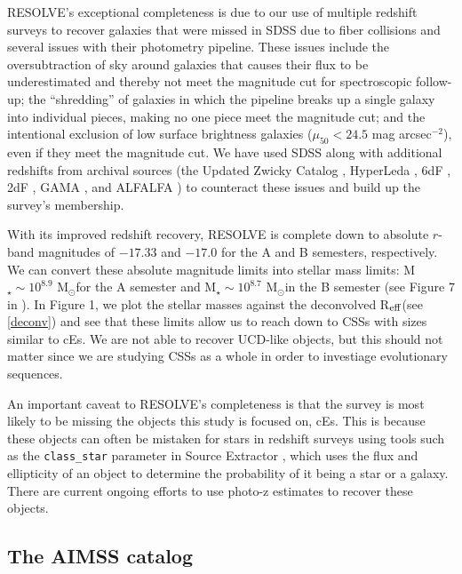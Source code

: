 \documentclass[iop,apj,twocolappendix]{emulateapj}
\newcommand{\Reff}{R$_{\rm eff}$}
\newcommand{\Msun}{M$_{\odot}$}
\begin{document}
RESOLVE's exceptional completeness is due to our use of multiple redshift surveys to recover galaxies that were missed in SDSS due to fiber collisions and several issues with their photometry pipeline. These issues include the oversubtraction of sky around galaxies that causes their flux to be underestimated and thereby not meet the magnitude cut for spectroscopic follow-up; the ``shredding'' of galaxies in which the pipeline breaks up a single galaxy into individual pieces, making no one piece meet the magnitude cut; and the intentional exclusion of low surface brightness galaxies ($\mu_{50} < 24.5$ mag arcsec$^{-2}$), even if they meet the magnitude cut. We have used SDSS along with additional redshifts from archival sources (the Updated Zwicky Catalog \citep{Falco1999}, HyperLeda \citep{Paturel2003}, 6dF \citep{Jones2009}, 2dF \citep{Colless2001}, GAMA \citep{Driver2011}, and ALFALFA \citep{Haynes2011}) to counteract these issues and build up the survey's membership.

With its improved redshift recovery, RESOLVE is complete down to absolute $r$-band magnitudes of $-17.33$ and $-17.0$ for the A and B semesters, respectively. We can convert these absolute magnitude limits into stellar mass limits: M$_{\star} \sim 10^{8.9}$ \Msun for the A semester and M$_{\star} \sim 10^{8.7}$ \Msun in the B semester (see Figure 7 in \citet{Eckert2015B}). In Figure 1, we plot the stellar masses against the deconvolved \Reff (see \autoref{deconv}) and see that these limits allow us to reach down to CSSs with sizes similar to cEs. We are not able to recover UCD-like objects, but this should not matter since we are studying CSSs as a whole in order to investiage evolutionary sequences.

An important caveat to RESOLVE's completeness is that the survey is most likely to be missing the objects this study is focused on, cEs. This is because these objects can often be mistaken for stars in redshift surveys using tools such as the \texttt{class\_star} parameter in Source Extractor \citep{Bertin1996}, which uses the flux and ellipticity of an object to determine the probability of it being a star or a galaxy. There are current ongoing efforts to use photo-z estimates to recover these objects.

\subsection{The AIMSS catalog}
\label{aimss}
\end{document}
